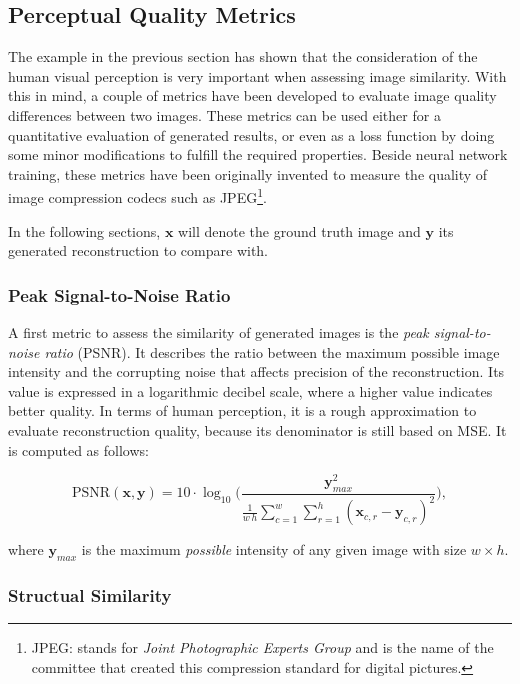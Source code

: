 \subsection{Perceptual Quality Metrics} \label{sec:img_metrics}

The example in the previous section has shown that the consideration of the human visual perception is very important when assessing image similarity. With this in mind, a couple of metrics have been developed to evaluate image quality differences between two images. These metrics can be used either for a quantitative evaluation of generated results, or even as a loss function by doing some minor modifications to fulfill the required properties. Beside neural network training, these metrics have been originally invented to measure the quality of image compression codecs such as JPEG\footnote{JPEG: stands for \textit{Joint Photographic Experts Group} and is the name of the committee that created this compression standard for digital pictures.}.

In the following sections, $ \textbf{x} $ will denote the ground truth image and $ \textbf{y} $ its generated reconstruction to compare with.

\subsubsection*{Peak Signal-to-Noise Ratio}

A first metric to assess the similarity of generated images is the \textit{peak signal-to-noise ratio} (PSNR). It describes the ratio between the maximum possible image intensity and the corrupting noise that affects precision of the reconstruction. Its value is expressed in a logarithmic decibel scale, where a higher value indicates better quality. In terms of human perception, it is a rough approximation to evaluate reconstruction quality, because its denominator is still based on MSE. It is computed as follows:

\begin{equation} \label{eq:psnr}
\textrm{PSNR}(\textbf{x}, \textbf{y}) = 10 \cdot \log_{10} \Bigg( \frac{\textbf{y}_{max}^2}{\frac{1}{w \, h} \sum_{c=1}^{w} \sum_{r=1}^{h} (\textbf{x}_{c,r} - \textbf{y}_{c,r})^2 } \Bigg) ,
\end{equation}

where $ \textbf{y}_{max} $ is the maximum \textit{possible} intensity of any given image with size $ w \times h $.


\subsubsection*{Structual Similarity}

